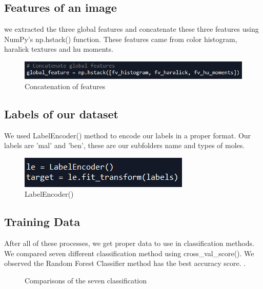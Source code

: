 \documentclass[onecolumn]{article}
\begin{document}
\subsection{Features of an image}
we extracted the three global features and concatenate these three features using NumPy’s np.hstack() function. These features came from color histogram, haralick textures and hu moments.

\begin{figure}[H]
\centering
  \includegraphics[scale=0.8]{images/global_feature.PNG}
  \caption{Concatenation of features}
  \label{fig:6}
\end{figure}

\subsection{Labels of our dataset}
We used LabelEncoder() method to encode our labels in a proper format. Our labels are 'mal' and 'ben', these are our subfolders name and types of moles.

\begin{figure}[H]
\centering
  \includegraphics[scale=0.7]{images/labels.PNG}
  \caption{LabelEncoder()}
  \label{fig:6}
\end{figure}

\subsection{Training Data}
After all of these processes, we get proper data to use in classification methods. We compared seven different classification method using cross\_val\_score(). We observed the Random Forest Classifier method has the best accuracy score. .

\begin{figure}[H]
    \centering
    \subfloat
    \qquad
    \subfloat
    \caption{Comparisons of the seven classification}%
    \label{fig:2}%
\end{figure}
\end{document}
